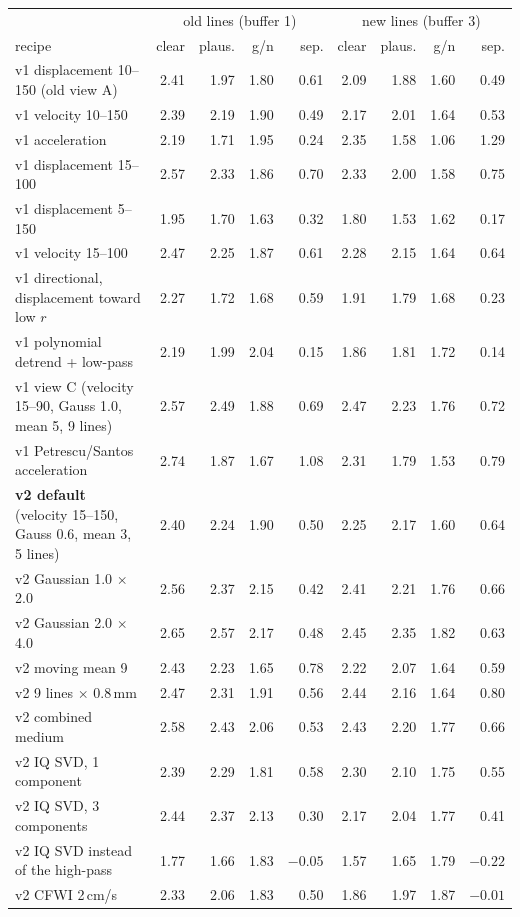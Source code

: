 \documentclass[10pt]{article}
\begin{document}
\begin{center}
\footnotesize
\begin{tabular}{lrrrrrrrr}
\toprule
 & \multicolumn{4}{c}{old lines (buffer 1)} & \multicolumn{4}{c}{new lines (buffer 3)} \\
recipe & clear & plaus. & g/n & sep. & clear & plaus. & g/n & sep. \\
\midrule
v1 displacement 10--150 (old view A) & 2.41 & 1.97 & 1.80 & 0.61 & 2.09 & 1.88 & 1.60 & 0.49 \\
v1 velocity 10--150 & 2.39 & 2.19 & 1.90 & 0.49 & 2.17 & 2.01 & 1.64 & 0.53 \\
v1 acceleration & 2.19 & 1.71 & 1.95 & 0.24 & 2.35 & 1.58 & 1.06 & 1.29 \\
v1 displacement 15--100 & 2.57 & 2.33 & 1.86 & 0.70 & 2.33 & 2.00 & 1.58 & 0.75 \\
v1 displacement 5--150 & 1.95 & 1.70 & 1.63 & 0.32 & 1.80 & 1.53 & 1.62 & 0.17 \\
v1 velocity 15--100 & 2.47 & 2.25 & 1.87 & 0.61 & 2.28 & 2.15 & 1.64 & 0.64 \\
v1 directional, displacement toward low $r$ & 2.27 & 1.72 & 1.68 & 0.59 & 1.91 & 1.79 & 1.68 & 0.23 \\
v1 polynomial detrend + low-pass & 2.19 & 1.99 & 2.04 & 0.15 & 1.86 & 1.81 & 1.72 & 0.14 \\
v1 view C (velocity 15--90, Gauss 1.0, mean 5, 9 lines) & 2.57 & 2.49 & 1.88 & 0.69 & 2.47 & 2.23 & 1.76 & 0.72 \\
v1 Petrescu/Santos acceleration & 2.74 & 1.87 & 1.67 & 1.08 & 2.31 & 1.79 & 1.53 & 0.79 \\
\midrule
\textbf{v2 default} (velocity 15--150, Gauss 0.6, mean 3, 5 lines) & 2.40 & 2.24 & 1.90 & 0.50 & 2.25 & 2.17 & 1.60 & 0.64 \\
v2 Gaussian 1.0 $\times$ 2.0 & 2.56 & 2.37 & 2.15 & 0.42 & 2.41 & 2.21 & 1.76 & 0.66 \\
v2 Gaussian 2.0 $\times$ 4.0 & 2.65 & 2.57 & 2.17 & 0.48 & 2.45 & 2.35 & 1.82 & 0.63 \\
v2 moving mean 9 & 2.43 & 2.23 & 1.65 & 0.78 & 2.22 & 2.07 & 1.64 & 0.59 \\
v2 9 lines $\times$ 0.8\,mm & 2.47 & 2.31 & 1.91 & 0.56 & 2.44 & 2.16 & 1.64 & 0.80 \\
v2 combined medium & 2.58 & 2.43 & 2.06 & 0.53 & 2.43 & 2.20 & 1.77 & 0.66 \\
v2 IQ SVD, 1 component & 2.39 & 2.29 & 1.81 & 0.58 & 2.30 & 2.10 & 1.75 & 0.55 \\
v2 IQ SVD, 3 components & 2.44 & 2.37 & 2.13 & 0.30 & 2.17 & 2.04 & 1.77 & 0.41 \\
v2 IQ SVD instead of the high-pass & 1.77 & 1.66 & 1.83 & $-0.05$ & 1.57 & 1.65 & 1.79 & $-0.22$ \\
v2 CFWI 2\,cm/s & 2.33 & 2.06 & 1.83 & 0.50 & 1.86 & 1.97 & 1.87 & $-0.01$ \\
\bottomrule
\end{tabular}
\end{center}
\end{document}
